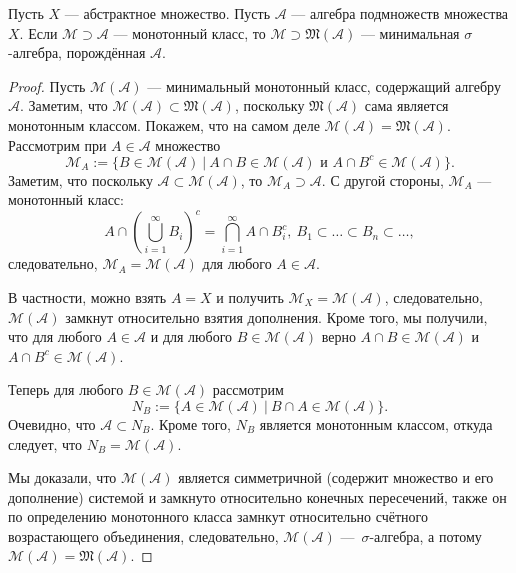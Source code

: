 \begin{theorem}
    Пусть $X$ — абстрактное множество.
    Пусть $\mathcal{A}$ — алгебра подмножеств множества $X$.
    Если $\mathcal{M} \supset \mathcal{A}$ — монотонный класс, то $\mathcal{M} \supset \mathfrak{M}(\mathcal{A})$ — минимальная $\sigma$-алгебра, порождённая $\mathcal{A}$.
\end{theorem} 
\begin{proof}
    Пусть $\mathcal{M}(\mathcal{A})$ — минимальный монотонный класс, содержащий алгебру $\mathcal{A}$.
    Заметим, что $\mathcal{M}(\mathcal{A}) \subset \mathfrak{M}(\mathcal{A})$, поскольку $\mathfrak{M}(\mathcal{A})$ сама является монотонным классом.
    Покажем, что на самом деле $\mathcal{M}(\mathcal{A}) = \mathfrak{M}(\mathcal{A})$.
    Рассмотрим при $A \in \mathcal{A}$ множество
    \[\mathcal{M}_A := \{B\in \mathcal{M}(\mathcal{A}) \ | \ A \cap B \in \mathcal{M}(\mathcal{A}) \text{ и } A \cap B^c \in \mathcal{M}(\mathcal{A})\}.\]
    Заметим, что поскольку $\mathcal{A} \subset \mathcal{M}(\mathcal{A})$, то $\mathcal{M}_A \supset \mathcal{A}$.
    С другой стороны, $\mathcal{M}_A$ — монотонный класс:
    \[A \cap \left(\bigcup\limits_{i=1}^{\infty}B_i\right)^c = \bigcap\limits_{i=1}^{\infty} A \cap B_i^c, \ B_1 \subset \dots \subset B_n \subset \dots,\]
    следовательно, $\mathcal{M}_A = \mathcal{M}(\mathcal{A})$ для любого $A \in \mathcal{A}$.
    
    В частности, можно взять $A = X$ и получить $\mathcal{M}_X = \mathcal{M}(\mathcal{A})$, следовательно, $\mathcal{M}(\mathcal{A})$ замкнут относительно взятия дополнения.
    Кроме того, мы получили, что для любого $A \in \mathcal{A}$ и для любого $B \in \mathcal{M}(\mathcal{A})$ верно $A \cap B \in \mathcal{M}(\mathcal{A})$ и $A \cap B^c \in \mathcal{M}(\mathcal{A})$.
    
    Теперь для любого $B \in \mathcal{M}(\mathcal{A})$ рассмотрим
    \[N_B := \{A \in \mathcal{M}(\mathcal{A}) \ | \ B \cap A \in \mathcal{M}(\mathcal{A})\}.\]
    Очевидно, что $\mathcal{A} \subset N_B$.
    Кроме того, $N_B$ является монотонным классом, откуда следует, что $N_B = \mathcal{M}(\mathcal{A})$.

    Мы доказали, что $\mathcal{M}(\mathcal{A})$ является симметричной (содержит множество и его дополнение) системой и замкнуто относительно конечных пересечений, также он по определению монотонного класса замнкут относительно счётного возрастающего объединения, следовательно, $\mathcal{M}(\mathcal{A})$ — $\sigma$-алгебра, а потому $\mathcal{M}(\mathcal{A}) = \mathfrak{M}(\mathcal{A})$.
\end{proof}

